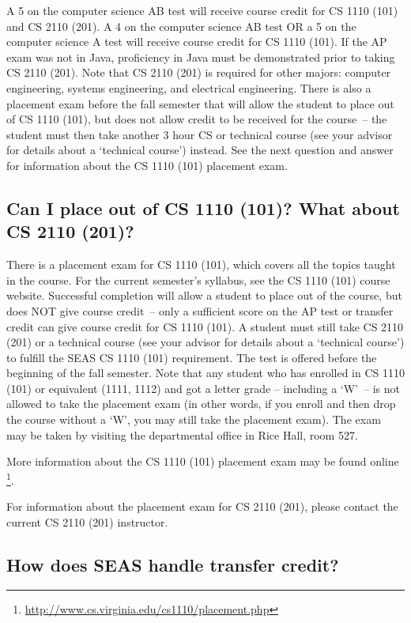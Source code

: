 \documentclass[10pt,letter]{book}
\newcommand{\myurl}[1]{\footnote{\scriptsize\url{#1}}}
\begin{document}
A 5 on the computer science AB test will receive course credit for CS
1110 (101) and CS 2110 (201). A 4 on the computer science AB test OR a
5 on the computer science A test will receive course credit for CS
1110 (101). If the AP exam was not in Java, proficiency in Java must
be demonstrated prior to taking CS 2110 (201). Note that CS 2110 (201)
is required for other majors: computer engineering, systems
engineering, and electrical engineering. There is also a placement
exam before the fall semester that will allow the student to place out
of CS 1110 (101), but does not allow credit to be received for the
course~-- the student must then take another 3 hour CS or technical
course (see your advisor for details about a ‘technical course’)
instead. See the next question and answer for information about the CS
1110 (101) placement exam.

\subsection{Can I place out of CS 1110 (101)? What about CS 2110
  (201)?}
\label{101placement}

There is a placement exam for CS 1110 (101), which covers all the
topics taught in the course. For the current semester's syllabus, see
the CS 1110 (101) course website. Successful completion will allow a
student to place out of the course, but does NOT give course credit~--
only a sufficient score on the AP test or transfer credit can give
course credit for CS 1110 (101). A student must still take CS 2110
(201) or a technical course (see your advisor for details about a
‘technical course’) to fulfill the SEAS CS 1110 (101) requirement. The
test is offered before the beginning of the fall semester. Note that
any student who has enrolled in CS 1110 (101) or equivalent (1111,
1112) and got a letter grade – including a ‘W’~-- is not allowed to
take the placement exam (in other words, if you enroll and then drop
the course without a ‘W’, you may still take the placement exam). The
exam may be taken by visiting the departmental office in Rice Hall,
room 527.

More information about the CS 1110 (101) placement exam may be found online
\myurl{http://www.cs.virginia.edu/cs1110/placement.php}.

For information about the placement exam for CS 2110 (201), please
contact the current CS 2110 (201) instructor.

\subsection{How does SEAS handle transfer credit?}
\end{document}
